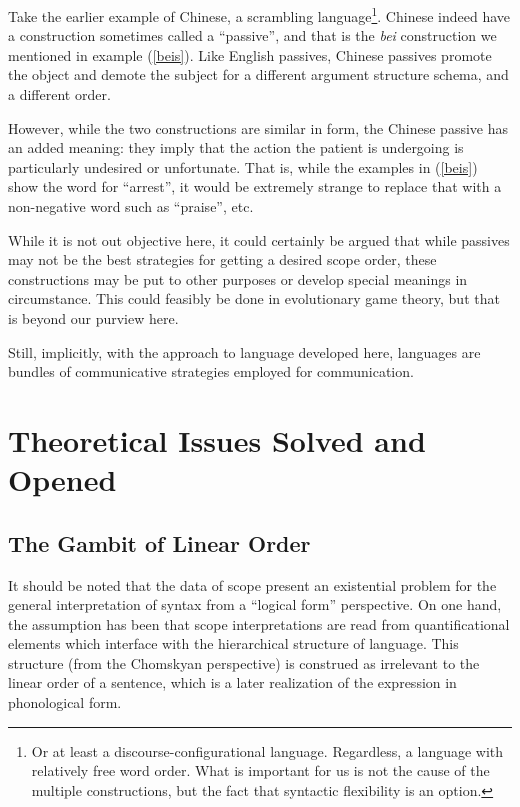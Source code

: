 \documentclass{article}
\begin{document}
Take the earlier example of Chinese, a scrambling language\footnote{Or at least a discourse-configurational language. Regardless, a language with relatively free word order. What is important for us is not the cause of the multiple constructions, but the fact that syntactic flexibility is an option.}.
Chinese indeed have a construction sometimes called a ``passive'', and that is the \textit{bei} construction we mentioned in example (\ref{beis}).
Like English passives, Chinese passives promote the object and demote the subject for a different argument structure schema, and a different order.

However, while the two constructions are similar in form, the Chinese passive has an added meaning: they imply that the action the patient is undergoing is particularly undesired or unfortunate.
That is, while the examples in (\ref{beis}) show the word for ``arrest'', it would be extremely strange to replace that with a non-negative word such as ``praise'', etc.

While it is not out objective here, it could certainly be argued that while passives may not be the best strategies for getting a desired scope order, these constructions may be put to other purposes or develop special meanings in circumstance.
This could feasibly be done in evolutionary game theory, but that is beyond our purview here.

Still, implicitly, with the approach to language developed here, languages are bundles of communicative strategies employed for communication.

\section{Theoretical Issues Solved and Opened}

\subsection{The Gambit of Linear Order}

It should be noted that the data of scope present an existential problem for the general interpretation of syntax from a ``logical form'' perspective. On one hand, the assumption has been that scope interpretations are read from quantificational elements which interface with the hierarchical structure of language. This structure (from the Chomskyan perspective) is construed as irrelevant to the linear order of a sentence, which is a later realization of the expression in phonological form.
\end{document}
